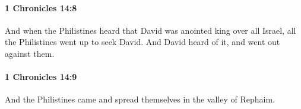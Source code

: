 		\paragraph{1 Chronicles 14:8} %
			\label{1CHRONICLES-14-8}

			And when the Philistines heard that David was anointed king over all Israel, all the Philistines went up to seek David. And David heard of it, and went out against them.


		\paragraph{1 Chronicles 14:9} %
			\label{1CHRONICLES-14-9}

			And the Philistines came and spread themselves in the valley of Rephaim.


